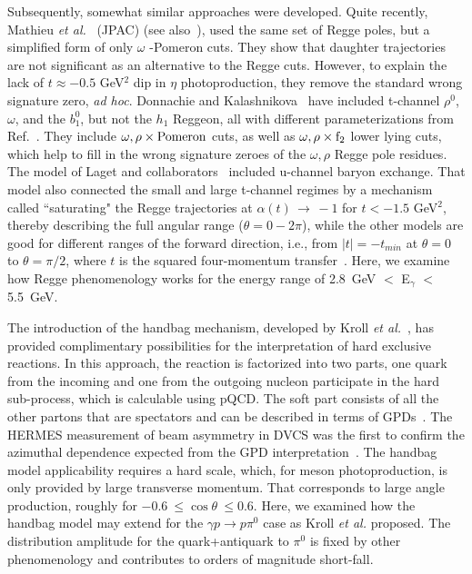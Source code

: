 \documentclass[aps,prc,twocolumn,floatfix,showpacs,preprintnumbers,amsmath,amssymb,superscriptaddress,linenumbers]{revtex4-1}
\begin{document}
Subsequently, somewhat similar approaches were developed.  
Quite recently, Mathieu {\it et al.}~\cite{Mathieu:2015eia} (JPAC) 
(see also~\cite{Kashevarov:2017vyl}), used the same set of Regge poles, 
but a simplified form of only $\omega$ -Pomeron cuts. They show that 
daughter trajectories are not significant as an alternative to the 
Regge cuts. However, to explain the lack of $t\approx -0.5$ GeV$^2$ 
dip in $\eta$ photoproduction, they remove the standard wrong signature 
zero, {\it ad hoc}.  Donnachie and Kalashnikova~\cite{Donnachie:2015jaa} 
have included t-channel $\rho^0$, $\omega$, and the $b^0_1$, but not 
the $h_1$ Reggeon, all with different parameterizations from 
Ref.~\cite{Goldstein:1973xn}. They include $\omega, \rho \times {\rm 
Pomeron}$ cuts, as well as $\omega, \rho \times {\rm f}_2$ lower lying 
cuts, which help to fill in the wrong signature zeroes of the $\omega, 
\rho$ Regge pole residues. The model of Laget and 
collaborators~\cite{Laget:2005be} included u-channel baryon exchange. 
That model also connected the small and large t-channel regimes by a 
mechanism called ``saturating" the Regge trajectories at $\alpha(t) \, 
\rightarrow \, -1$ for $t < -1.5$ GeV$^2$, thereby describing the full 
angular range ($\theta = 0 - 2\pi$), while the other models are good 
for different ranges of the forward direction, i.e., from $|t| = 
-t_{min}$ at $\theta=0$ to $\theta=\pi/2$, where $t$ is the squared 
four-momentum transfer~\cite{Goldstein:1973xn,Mathieu:2015eia,
Donnachie:2015jaa}. Here, we examine how Regge phenomenology works for 
the energy range of 2.8~GeV $< $ E$_\gamma$ $<$ 5.5~GeV.

 
The introduction of the handbag mechanism, developed by 
Kroll \textit{et al.}~\cite{Huang:2000kd}, has provided complimentary 
possibilities for the interpretation of hard exclusive reactions. In 
this approach, the reaction is factorized into two parts, one quark 
from the incoming and one from the outgoing nucleon participate in the 
hard sub-process, which is calculable using pQCD. The soft part 
consists of all the other partons that are spectators and can be 
described in terms of GPDs~\cite{Ji:1996nm}.
The HERMES measurement of beam asymmetry in DVCS was the first 
to confirm the azimuthal dependence expected from the GPD interpretation~\cite{Amarian:2000vx}.
The handbag model applicability requires a hard scale, which, for meson 
photoproduction, is only provided by large transverse momentum. That 
corresponds to large angle production, roughly for 
$-0.6~\leq\cos\theta~\leq 0.6$.  Here, we examined how the handbag 
model may extend for the $\gamma p\rightarrow p\pi^0$ case as Kroll 
\textit{et al.} proposed. The distribution amplitude for the 
quark+antiquark to $\pi^0$ is fixed by other phenomenology and 
contributes to orders of magnitude short-fall.
\end{document}
